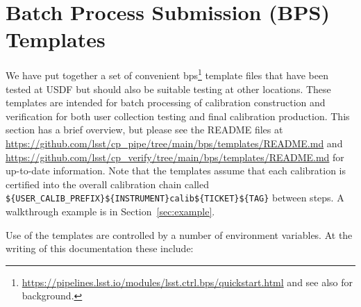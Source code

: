 \documentclass[DM,authoryear,toc]{lsstdoc}
\begin{document}
\section{Batch Process Submission (BPS) Templates}

We have put together a set of convenient bps\footnote{\url{https://pipelines.lsst.io/modules/lsst.ctrl.bps/quickstart.html} and see also \citet{2022arXiv221115795G} for background.} template files that have been tested at USDF but should also be suitable testing at other locations.
These templates are intended for batch processing of calibration construction and verification for both user collection testing and final calibration production.
This section has a brief overview, but please see the README files at \url{https://github.com/lsst/cp_pipe/tree/main/bps/templates/README.md} and \url{https://github.com/lsst/cp_verify/tree/main/bps/templates/README.md} for up-to-date information.
Note that the templates assume that each calibration is certified into the overall calibration chain called \texttt{\$\{USER\_CALIB\_PREFIX\}\$\{INSTRUMENT\}\/calib\/\$\{TICKET\}\/\$\{TAG\}} between steps.
A walkthrough example is in Section~\ref{sec:example}.

Use of the templates are controlled by a number of environment variables.
At the writing of this documentation these include:
\end{document}
